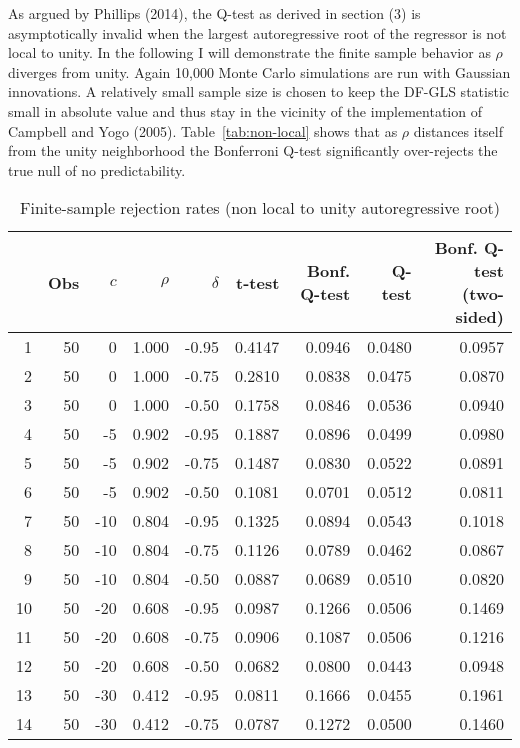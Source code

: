 \documentclass{article}
\begin{document}
As argued by Phillips (2014), the Q-test as derived in section (3) is asymptotically invalid when the largest autoregressive root of the regressor is not local to unity. In the following I will demonstrate the finite sample behavior as $\rho$ diverges from unity. Again 10,000 Monte Carlo simulations are run with Gaussian innovations. A relatively small sample size is chosen to keep the DF-GLS statistic small in absolute value and thus stay in the vicinity of the implementation of Campbell and Yogo (2005). Table~\vref{tab:non-local} shows that as $\rho$ distances itself from the unity neighborhood the Bonferroni Q-test significantly over-rejects the true null of no predictability. 
\begin{table}[h!]
\caption{Finite-sample rejection rates (non local to unity autoregressive root) }
\label{tab:non-local}
\centering
\begin{threeparttable}
\begin{tabular}{rrrrrrrrr}
  \hline
 & Obs & $c$ & $\rho$ & $\delta$ & t-test & Bonf. Q-test & Q-test & Bonf. Q-test (two-sided) \\ 
  \hline
1 & 50 & 0 & 1.000 & -0.95 & 0.4147 & 0.0946 & 0.0480 & 0.0957 \\ 
  2 & 50 & 0 & 1.000 & -0.75 & 0.2810 & 0.0838 & 0.0475 & 0.0870 \\ 
  3 & 50 & 0 & 1.000 & -0.50 & 0.1758 & 0.0846 & 0.0536 & 0.0940 \\ 
  4 & 50 & -5 & 0.902 & -0.95 & 0.1887 & 0.0896 & 0.0499 & 0.0980 \\ 
  5 & 50 & -5 & 0.902 & -0.75 & 0.1487 & 0.0830 & 0.0522 & 0.0891 \\ 
  6 & 50 & -5 & 0.902 & -0.50 & 0.1081 & 0.0701 & 0.0512 & 0.0811 \\ 
  7 & 50 & -10 & 0.804 & -0.95 & 0.1325 & 0.0894 & 0.0543 & 0.1018 \\ 
  8 & 50 & -10 & 0.804 & -0.75 & 0.1126 & 0.0789 & 0.0462 & 0.0867 \\ 
  9 & 50 & -10 & 0.804 & -0.50 & 0.0887 & 0.0689 & 0.0510 & 0.0820 \\ 
  10 & 50 & -20 & 0.608 & -0.95 & 0.0987 & 0.1266 & 0.0506 & 0.1469 \\ 
  11 & 50 & -20 & 0.608 & -0.75 & 0.0906 & 0.1087 & 0.0506 & 0.1216 \\ 
  12 & 50 & -20 & 0.608 & -0.50 & 0.0682 & 0.0800 & 0.0443 & 0.0948 \\ 
  13 & 50 & -30 & 0.412 & -0.95 & 0.0811 & 0.1666 & 0.0455 & 0.1961 \\ 
  14 & 50 & -30 & 0.412 & -0.75 & 0.0787 & 0.1272 & 0.0500 & 0.1460 \\ 

\end{tabular}
\end{threeparttable}
\end{table}
\end{document}
